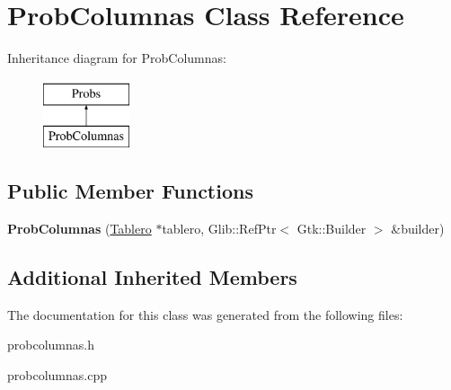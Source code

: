 \hypertarget{classProbColumnas}{\section{Prob\-Columnas Class Reference}
\label{classProbColumnas}
}
Inheritance diagram for Prob\-Columnas\-:\begin{figure}[H]
\begin{center}
\leavevmode
\includegraphics[height=2.000000cm]{classProbColumnas}
\end{center}
\end{figure}
\subsection*{Public Member Functions}
\begin{DoxyCompactItemize}
\item 
\hypertarget{classProbColumnas_a660c108a2f78121c8dce6a406af268ea}{{\bfseries Prob\-Columnas} (\hyperlink{classTablero}{Tablero} $\ast$tablero, Glib\-::\-Ref\-Ptr$<$ Gtk\-::\-Builder $>$ \&builder)}\label{classProbColumnas_a660c108a2f78121c8dce6a406af268ea}

\end{DoxyCompactItemize}
\subsection*{Additional Inherited Members}


The documentation for this class was generated from the following files\-:\begin{DoxyCompactItemize}
\item 
probcolumnas.\-h\item 
probcolumnas.\-cpp\end{DoxyCompactItemize}
